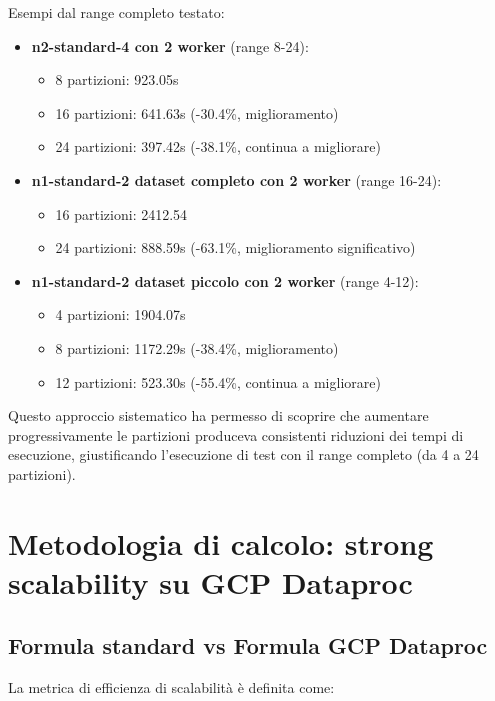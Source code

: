 \documentclass[8pt,a4paper]{article}
\begin{document}
Esempi dal range completo testato:

\begin{itemize}
    \item \textbf{n2-standard-4 con 2 worker} (range 8-24):
    \begin{itemize}
        \item 8 partizioni: 923.05s
        \item 16 partizioni: 641.63s (-30.4\%, miglioramento)
        \item 24 partizioni: 397.42s (-38.1\%, continua a migliorare)
    \end{itemize}
    
    \item \textbf{n1-standard-2 dataset completo con 2 worker} (range 16-24):
    \begin{itemize}
        \item 16 partizioni: 2412.54
        \item 24 partizioni: 888.59s (-63.1\%, miglioramento significativo)
    \end{itemize}
    
    \item \textbf{n1-standard-2 dataset piccolo con 2 worker} (range 4-12):
    \begin{itemize}
        \item 4 partizioni: 1904.07s 
        \item 8 partizioni: 1172.29s (-38.4\%, miglioramento)
        \item 12 partizioni: 523.30s (-55.4\%, continua a migliorare)
    \end{itemize}
\end{itemize}
\noindent
Questo approccio sistematico ha permesso di scoprire che aumentare progressivamente le partizioni produceva consistenti riduzioni dei tempi di esecuzione, giustificando l'esecuzione di test con il range completo (da 4 a 24 partizioni).


\section{Metodologia di calcolo: strong scalability su GCP Dataproc}

\subsection{Formula standard vs Formula GCP Dataproc}

La metrica di efficienza di scalabilità è definita come:
\end{document}
